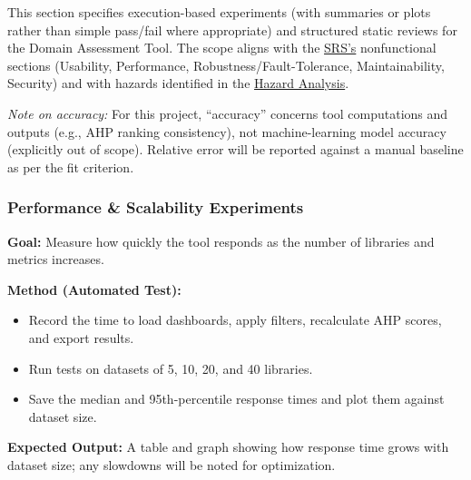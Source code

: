 \documentclass[12pt, titlepage]{article}
\begin{document}


\label{sec:nfr-tests}

This section specifies execution-based experiments (with summaries or plots rather than simple pass/fail where appropriate) and structured static reviews for the Domain Assessment Tool. The scope aligns with the \href{https://github.com/thaafei/DomainX/blob/main/docs/SRS/SRS.pdf}{SRS’s} nonfunctional sections (Usability, Performance, Robustness/Fault-Tolerance, Maintainability, Security) and with hazards identified in the \href{https://github.com/thaafei/DomainX/blob/main/docs/HazardAnalysis/HazardAnalysis.pdf}{Hazard Analysis}.

\textit{Note on accuracy:} For this project, ``accuracy'' concerns tool computations and outputs (e.g., AHP ranking consistency), not machine-learning model accuracy (explicitly out of scope). Relative error will be reported against a manual baseline as per the fit criterion.

\subsubsection{Performance \& Scalability Experiments}
\label{subsubsec:performance}

\textbf{Goal:} Measure how quickly the tool responds as the number of libraries and metrics increases.

\textbf{Method (Automated Test):}
\begin{itemize}
  \item Record the time to load dashboards, apply filters, recalculate AHP scores, and export results.
  \item Run tests on datasets of 5, 10, 20, and 40 libraries.
  \item Save the median and 95th-percentile response times and plot them against dataset size.
\end{itemize}

\textbf{Expected Output:} A table and graph showing how response time grows with dataset size; any slowdowns will be noted for optimization.
\end{document}
